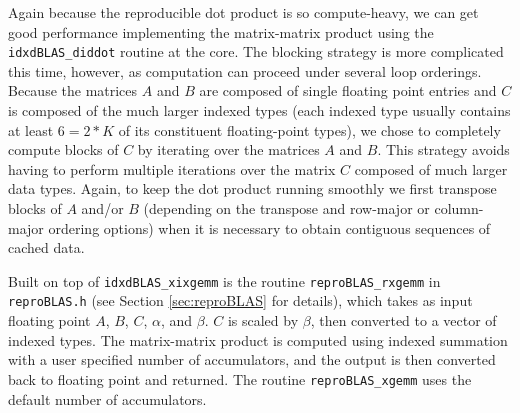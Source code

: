   Again because the reproducible dot product is so compute-heavy, we can get good performance implementing the matrix-matrix product using the \texttt{idxdBLAS\_diddot} routine at the core. The blocking strategy is more complicated this time, however, as computation can proceed under several loop orderings. Because the matrices $A$ and $B$ are composed of single floating point entries and $C$ is composed of the much larger indexed types (each indexed type usually contains at least $6 = 2 * K$ of its constituent floating-point types), we chose to completely compute blocks of $C$ by iterating over the matrices $A$ and $B$. This strategy avoids having to perform multiple iterations over the matrix $C$ composed of much larger data types. 
  Again, to keep the dot product running smoothly we first transpose blocks of $A$ and/or $B$ (depending on the transpose and row-major or column-major ordering options) when it is necessary to obtain contiguous sequences of cached data.

  Built on top of \texttt{idxdBLAS\_xixgemm} is the routine \texttt{reproBLAS\_rxgemm} in \texttt{reproBLAS.h} (see Section \ref{sec:reproBLAS} for details), which takes as input floating point $A$, $B$, $C$, $\alpha$, and $\beta$. $C$ is scaled by $\beta$, then converted to a vector of indexed types. The matrix-matrix product is computed using indexed summation with a user specified number of accumulators, and the output is then converted back to floating point and returned. The routine \texttt{reproBLAS\_xgemm} uses the default number of accumulators.
